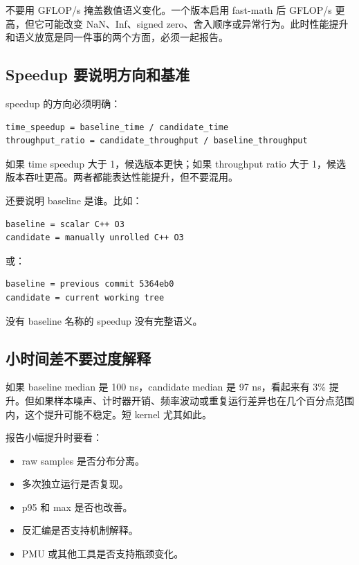 不要用 GFLOP/s 掩盖数值语义变化。一个版本启用 fast-math 后 GFLOP/s 更高，但它可能改变 NaN、Inf、signed zero、舍入顺序或异常行为。此时性能提升和语义放宽是同一件事的两个方面，必须一起报告。

\subsection{Speedup 要说明方向和基准}

speedup 的方向必须明确：

\begin{lstlisting}
time_speedup = baseline_time / candidate_time
throughput_ratio = candidate_throughput / baseline_throughput
\end{lstlisting}

如果 time speedup 大于 1，候选版本更快；如果 throughput ratio 大于 1，候选版本吞吐更高。两者都能表达性能提升，但不要混用。

还要说明 baseline 是谁。比如：

\begin{lstlisting}
baseline = scalar C++ O3
candidate = manually unrolled C++ O3
\end{lstlisting}

或：

\begin{lstlisting}
baseline = previous commit 5364eb0
candidate = current working tree
\end{lstlisting}

没有 baseline 名称的 speedup 没有完整语义。

\subsection{小时间差不要过度解释}

如果 baseline median 是 100 ns，candidate median 是 97 ns，看起来有 3\% 提升。但如果样本噪声、计时器开销、频率波动或重复运行差异也在几个百分点范围内，这个提升可能不稳定。短 kernel 尤其如此。

报告小幅提升时要看：

\begin{itemize}
  \item raw samples 是否分布分离。
  \item 多次独立运行是否复现。
  \item p95 和 max 是否也改善。
  \item 反汇编是否支持机制解释。
  \item PMU 或其他工具是否支持瓶颈变化。
\end{itemize}

